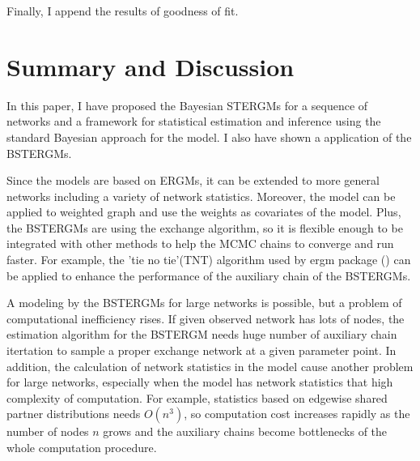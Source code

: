 \documentclass[aspectratio=169,ignorenonframetext,9pt]{beamer}
\theoremstyle{plain}
\theoremstyle{definition}
\begin{document}
Finally, I append the results of goodness of fit.

\section{Summary and Discussion}
In this paper, I have proposed the Bayesian STERGMs for a sequence of networks
and a framework for statistical estimation and inference using the standard Bayesian approach for the model.
I also have shown a application of the BSTERGMs. %

Since the models are based on ERGMs, it can be extended to more general networks
including a variety of network statistics.
Moreover, the model can be applied to weighted graph and use the weights as covariates of the model.
Plus, the BSTERGMs are using the exchange algorithm, so it is flexible enough to be integrated
with other methods to help the MCMC chains to converge and run faster.
For example, the 'tie no tie'(TNT) algorithm used by ergm package (\cite{RN100}) can be applied to
enhance the performance of the auxiliary chain of the BSTERGMs.

A modeling by the BSTERGMs for large networks is possible,
but a problem of computational inefficiency rises.
If given observed network has lots of nodes, the estimation algorithm for the BSTERGM needs 
huge number of auxiliary chain itertation to sample a proper exchange network at a given parameter point.
In addition, the calculation of network statistics in the model cause another problem for large networks,
especially when the model has network statistics that high complexity of computation.
For example, statistics based on edgewise shared partner distributions needs $O(n^3)$,
so computation cost increases rapidly as the number of nodes $n$ grows and
the auxiliary chains become bottlenecks of the whole computation procedure.
\end{document}
